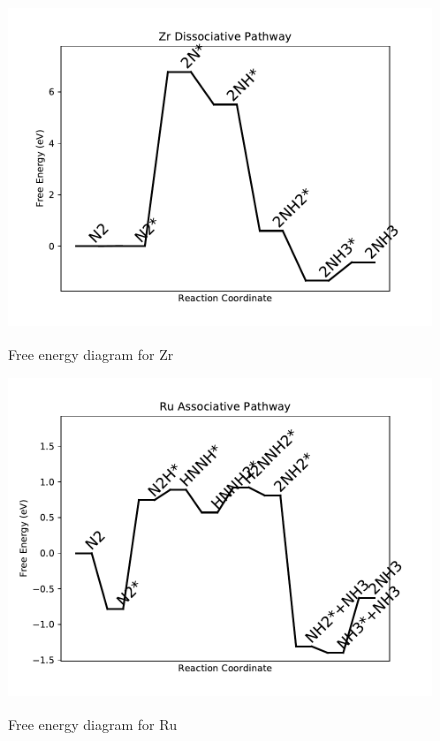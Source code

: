 \documentclass{article}
\begin{document}
\begin{figure}
\includegraphics[width=1\linewidth]{data/plots/Zr_dissociative.pdf}
\label{fig:Zr_dissociative}
\caption{Free energy diagram for Zr}
\end{figure}

\begin{figure}
\includegraphics[width=1\linewidth]{data/plots/Ru_associative.pdf}
\label{fig:Ru_associative}
\caption{Free energy diagram for Ru}
\end{figure}
\end{document}
